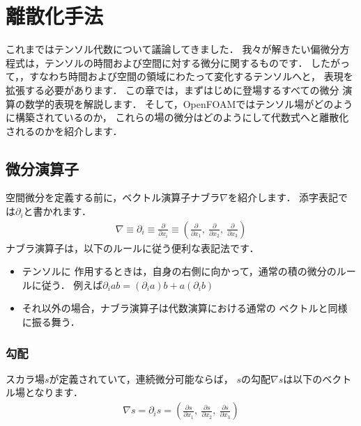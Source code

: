 \chapter{離散化手法}
\label{chap:2}
これまではテンソル代数について議論してきました．
我々が解きたい偏微分方程式は，テンソルの時間および空間に対する微分に関するものです．
したがって，，すなわち時間および空間の領域にわたって変化するテンソルへと，
表現を拡張する必要があります．
この章では，まずはじめに登場するすべての微分
%  
演算の数学的表現を解説します．
そして，OpenFOAMではテンソル場がどのように構築されているのか，
これらの場の微分はどのようにして代数式へと離散化されるのかを紹介します．



\section{微分演算子}
\label{sec:2.1}
%  
空間微分を定義する前に，ベクトル演算子ナブラ$\nabla$を紹介します．
添字表記では$\partial_{i}$と書かれます．
\begin{align}
 \label{eq:2.1}
 \nabla \equiv \partial_{i} \equiv \frac{\partial}{\partial x_{i}}
 \equiv \left(\frac{\partial}{\partial x_{1}},\
 \frac{\partial}{\partial x_{2}},\
 \frac{\partial}{\partial x_{3}}\right)
\end{align}
ナブラ演算子は，以下のルールに従う便利な表記法です．
\begin{itemize}
 \item テンソルに
%  
%  
作用するときは，自身の右側に向かって，通常の積の微分のルールに従う．
       例えば$\partial_{i}ab = (\partial_{i}a)b + a(\partial_{i}b)$
 \item それ以外の場合，ナブラ演算子は代数演算における通常の
\index{べくとる@ベクトル}%
ベクトルと同様に振る舞う．
\end{itemize}


\subsection{勾配}
\label{ssec:2.1.1}
スカラ場$s$が定義されていて，連続微分可能ならば，
$s$の勾配$\nabla s$は以下のベクトル場となります．
\begin{align}
 \label{eq:2.2}
 \nabla s = \partial_{i}s
 = \left(\frac{\partial s}{\partial x_{1}},\
 \frac{\partial s}{\partial x_{2}},\
 \frac{\partial s}{\partial x_{3}}\right)
\end{align}

